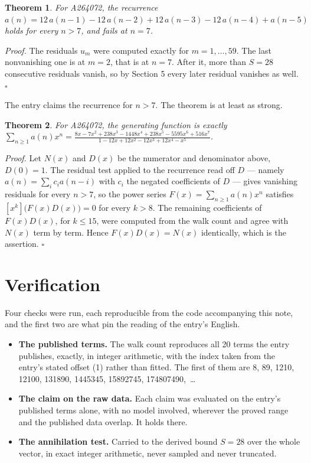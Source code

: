 \documentclass[11pt]{article}
\newtheorem{theorem}{Theorem}
\theoremstyle{definition}
\begin{document}
\begin{theorem} For A264072, the recurrence $a(n) = 12\,a(n-1) - 12\,a(n-2) + 12\,a(n-3) - 12\,a(n-4) + a(n-5)$ holds for every $n > 7$, and fails at $n = 7$.\end{theorem}

{\itshape Proof.} The residuals $u_m$ were computed exactly for $m = 1,\dots,59$. The last nonvanishing one is at $m = 2$, that is at $n = 7$. After it, more than $S = 28$ consecutive residuals vanish, so by Section 5 every later residual vanishes as well. $\square$

The entry claims the recurrence for $n > 7$. The theorem is at least as strong.

\begin{theorem} For A264072, the generating function is exactly $\sum_{n\ge 1} a(n)x^n = \frac{8x - 7x^{2} + 238x^{3} - 1448x^{4} + 238x^{5} - 5595x^{6} + 516x^{7}}{1 - 12x + 12x^{2} - 12x^{3} + 12x^{4} - x^{5}}$.\end{theorem}

{\itshape Proof.} Let $N(x)$ and $D(x)$ be the numerator and denominator above, $D(0)=1$. The residual test applied to the recurrence read off $D$ --- namely $a(n) = \sum_i c_i a(n-i)$ with $c_i$ the negated coefficients of $D$ --- gives vanishing residuals for every $n > 7$, so the power series $F(x)=\sum_{n\ge 1}a(n)x^n$ satisfies $[x^k]\bigl(F(x)D(x)\bigr) = 0$ for every $k > 8$. The remaining coefficients of $F(x)D(x)$, for $k \le 15$, were computed from the walk count and agree with $N(x)$ term by term. Hence $F(x)D(x) = N(x)$ identically, which is the assertion. $\square$

\section{Verification}

Four checks were run, each reproducible from the code accompanying this note, and the first two are what pin the reading of the entry's English.

\begin{itemize}

\item {\bfseries The published terms.} The walk count reproduces all 20 terms the entry publishes, exactly, in integer arithmetic, with the index taken from the entry's stated offset (1) rather than fitted. The first of them are 8, 89, 1210, 12100, 131890, 1445345, 15892745, 174807490,~\dots

\item {\bfseries The claim on the raw data.} Each claim was evaluated on the entry's published terms alone, with no model involved, wherever the proved range and the published data overlap. It holds there.

\item {\bfseries The annihilation test.} Carried to the derived bound $S = 28$ over the whole vector, in exact integer arithmetic, never sampled and never truncated.

\end{itemize}
\end{document}
